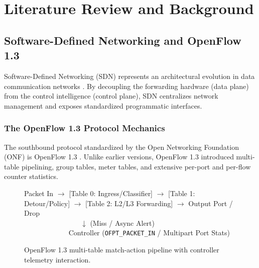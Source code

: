 \chapter{Literature Review and Background}
\label{ch:lit_review}

\section{Software-Defined Networking and OpenFlow 1.3}
Software-Defined Networking (SDN) represents an architectural evolution in data communication networks \cite{mckeown2008openflow, kreutz2015software}. By decoupling the forwarding hardware (data plane) from the control intelligence (control plane), SDN centralizes network management and exposes standardized programmatic interfaces.

\subsection{The OpenFlow 1.3 Protocol Mechanics}
The southbound protocol standardized by the Open Networking Foundation (ONF) is OpenFlow 1.3 \cite{openflow13spec}. Unlike earlier versions, OpenFlow 1.3 introduced multi-table pipelining, group tables, meter tables, and extensive per-port and per-flow counter statistics.

\begin{figure}[H]
  \centering
  \begin{tcolorbox}[colback=codebg,colframe=sdnnavy!60,arc=2pt,title=OpenFlow 1.3 Switch Pipeline]
  \centering
  \small\ttfamily
  Packet In $\longrightarrow$ [Table 0: Ingress/Classifier] $\longrightarrow$ [Table 1: Detour/Policy] $\longrightarrow$ [Table 2: L2/L3 Forwarding] $\longrightarrow$ Output Port / Drop\\
  $\quad\quad\quad\quad\quad\quad\quad\quad\downarrow$ (Miss / Async Alert)\\
  $\quad\quad\quad\quad\quad\quad$ Controller (\texttt{OFPT\_PACKET\_IN} / Multipart Port Stats)
  \end{tcolorbox}
  \caption{OpenFlow 1.3 multi-table match-action pipeline with controller telemetry interaction.}
  \label{fig:of13_pipeline}
\end{figure}

